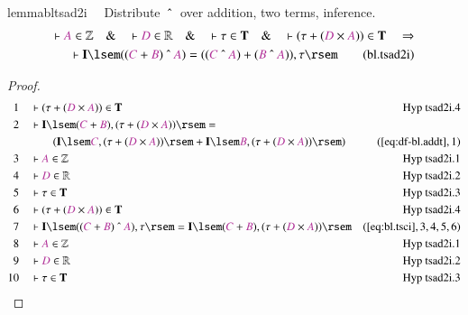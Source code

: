 \begin{restatable}{lemma}{bltsad2i}~~ Distribute $~\string^~$ over addition,
two terms, inference.
\begin{align}
\vdash \mc{A} \in \mathbb{Z}\quad\&\quad \vdash \mc{D} \in
    \mathbb{R}\quad\&\quad \vdash \tau \in \mathbf{T}\quad\&\quad \vdash ( \tau
    + ( \mc{D} \times \mc{A} ) ) \in \mathbf{T}\quad\Rightarrow \notag \\ %
     \quad \vdash
    \mathbf{I} \lsem ( ( \mc{C} + \mc{B} ) ~\string^~ \mc{A} ) = ( ( \mc{C}
    ~\string^~ \mc{A} ) + ( \mc{B} ~\string^~ \mc{A} ) ) , \tau
    \rsem\label{eq:bl.tsad2i}\tag{bl.tsad2i}
\end{align}
\end{restatable}

\begin{proof}
\begin{align}
  1 &&  & \vdash ( \tau + ( \mc{D} \times \mc{A} ) ) \in
      \mathbf{T}&\text{Hyp~tsad2i.4}\notag%
  \\ 2 &&  & \vdash \mathbf{I} \lsem ( \mc{C} + \mc{B} ) , ( \tau + ( \mc{D}
      \times \mc{A} ) ) \rsem =  \notag \\ & & & \qquad
     ( \mathbf{I} \lsem \mc{C} ,
      ( \tau + ( \mc{D} \times \mc{A} ) ) \rsem + \mathbf{I}
      \lsem \mc{B} , ( \tau + ( \mc{D} \times \mc{A} ) )
      \rsem )&(\mbox{\ref{eq:df-bl.addt}},1)\notag
  \\ 3 &&  & \vdash \mc{A} \in \mathbb{Z}&\text{Hyp~tsad2i.1}\notag%
  \\ 4 &&  & \vdash \mc{D} \in \mathbb{R}&\text{Hyp~tsad2i.2}\notag%
  \\ 5 &&  & \vdash \tau \in \mathbf{T}&\text{Hyp~tsad2i.3}\notag%
  \\ 6 &&  & \vdash ( \tau + ( \mc{D} \times \mc{A} ) ) \in
      \mathbf{T}&\text{Hyp~tsad2i.4}\notag%
  \\ 7 &&  & \vdash \mathbf{I} \lsem ( ( \mc{C} + \mc{B} ) ~\string^~ \mc{A} )
      , \tau \rsem = \mathbf{I} \lsem ( \mc{C} + \mc{B} ) ,
      ( \tau + ( \mc{D} \times \mc{A} ) )
      \rsem&(\mbox{\ref{eq:bl.tsci}},3,4,5,6)\notag
  \\ 8 &&  & \vdash \mc{A} \in \mathbb{Z}&\text{Hyp~tsad2i.1}\notag%
  \\ 9 &&  & \vdash \mc{D} \in \mathbb{R}&\text{Hyp~tsad2i.2}\notag%
  \\ 10 &&  & \vdash \tau \in \mathbf{T}&\text{Hyp~tsad2i.3}\notag%

\end{align}
\end{proof}
